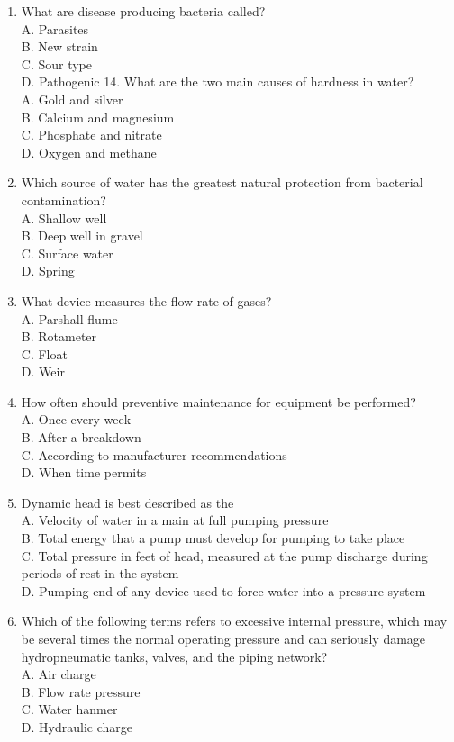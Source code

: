 \documentclass[10pt]{article}
\begin{document}
\begin{enumerate}
  \item What are disease producing bacteria called?\\
A. Parasites\\
B. New strain\\
C. Sour type\\
D. Pathogenic 14. What are the two main causes of hardness in water?\\
A. Gold and silver\\
B. Calcium and magnesium\\
C. Phosphate and nitrate\\
D. Oxygen and methane

  \item Which source of water has the greatest natural protection from bacterial contamination?\\
A. Shallow well\\
B. Deep well in gravel\\
C. Surface water\\
D. Spring

  \item What device measures the flow rate of gases?\\
A. Parshall flume\\
B. Rotameter\\
C. Float\\
D. Weir

  \item How often should preventive maintenance for equipment be performed?\\
A. Once every week\\
B. After a breakdown\\
C. According to manufacturer recommendations\\
D. When time permits

  \item Dynamic head is best described as the\\
A. Velocity of water in a main at full pumping pressure\\
B. Total energy that a pump must develop for pumping to take place\\
C. Total pressure in feet of head, measured at the pump discharge during periods of rest in the system\\
D. Pumping end of any device used to force water into a pressure system

  \item Which of the following terms refers to excessive internal pressure, which may be several times the normal operating pressure and can seriously damage hydropneumatic tanks, valves, and the piping network?\\
A. Air charge\\
B. Flow rate pressure\\
C. Water hanmer\\
D. Hydraulic charge


\end{enumerate}
\end{document}
